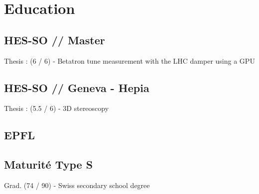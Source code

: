 \documentclass[a4paper]{deedy-resume} %
\begin{document}
\begin{minipage}[t]{0.33\textwidth} %


\section{Education}

\subsection{HES-SO // Master}

Thesis : (6 / 6) - Betatron tune measurement with the LHC damper using a GPU \\

\sectionspace %

\subsection{HES-SO // Geneva - Hepia}

Thesis : (5.5 / 6) - 3D stereoscopy \\

\sectionspace %


\subsection{EPFL}

\sectionspace

\subsection{Maturité Type S}

Grad. (74 / 90) - Swiss secondary school degree \\

\sectionspace %



\end{minipage}
\end{document}
